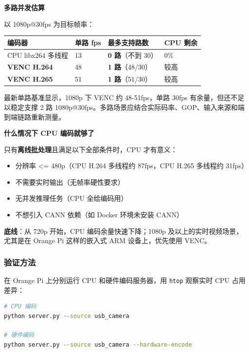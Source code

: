 \textbf{多路并发估算}

以 1080p@30fps 为目标帧率：

\begin{longtable}[]{@{}llll@{}}
\toprule\noalign{}
编码器 & 单路 fps & 最多支持路数 & CPU 剩余 \\
\midrule\noalign{}
\endhead
\bottomrule\noalign{}
\endlastfoot
CPU libx264 多线程 & 13 & \textbf{0 路}（不到 30） & 0\% \\
\textbf{VENC H.264} & 48 & \textbf{1 路}（48/30） & 较高 \\
\textbf{VENC H.265} & 51 & \textbf{1 路}（51/30） & 较高 \\
\end{longtable}

最新单路基准显示，1080p 下 VENC 约 48-51fps，单路 30fps
有余量，但还不足以稳定支撑 2 路
1080p@30fps。多路场景应结合实际码率、GOP、输入来源和端到端链路重新测量。

\textbf{什么情况下 CPU 编码就够了}

只有\textbf{离线批处理}且满足以下全部条件时，CPU 才有意义：

\begin{itemize}
\tightlist
\item
  分辨率 \textless= 480p（CPU H.264 多线程约 87fps，CPU H.265 多线程约
  31fps）
\item
  不需要实时输出（无帧率硬性要求）
\item
  无并发推理任务（CPU 全给编码用）
\item
  不想引入 CANN 依赖（如 Docker 环境未安装 CANN）
\end{itemize}

\textbf{底线}：从 720p 开始，CPU 编码余量快速下降；1080p
及以上的实时视频场景，尤其是在 Orange Pi 这样的嵌入式 ARM
设备上，优先使用 VENC。

\subsubsection{验证方法}\label{src-book-chapter6-h46}

在 Orange Pi 上分别运行 CPU 和硬件编码服务器，用
\passthrough{\lstinline!htop!} 观察实时 CPU 占用差异：

\begin{lstlisting}[language=bash]
# CPU 编码
python server.py --source usb_camera

# 硬件编码
python server.py --source usb_camera --hardware-encode
\end{lstlisting}

